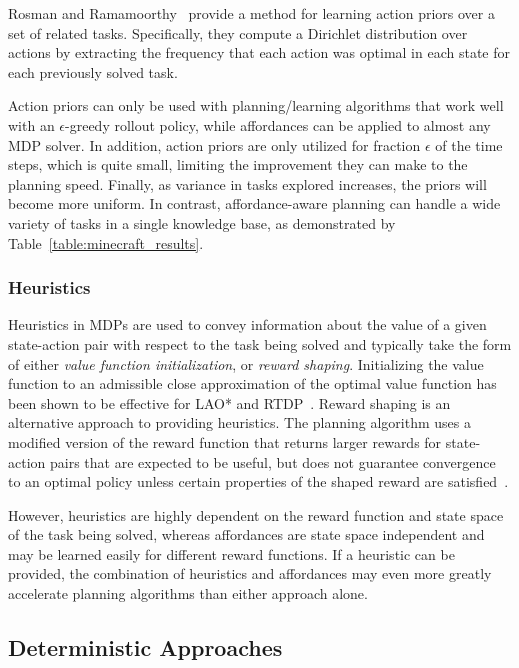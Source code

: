 \documentclass[letterpaper]{article}
\begin{document}
Rosman and Ramamoorthy~\cite{rosman2012good} provide a method for learning action
priors over a set of related tasks. Specifically, they compute a Dirichlet distribution over 
actions by extracting the frequency that each action was optimal in each state for each 
previously solved task.

Action priors can only be used with planning/learning algorithms that
work well with an $\epsilon$-greedy rollout policy, while affordances
can be applied to almost any MDP solver.  In addition, action
priors are only utilized for fraction $\epsilon$ of the time steps,
which is quite small, limiting the improvement they can make
to the planning speed.  Finally, as variance in tasks explored
increases, the priors will become more uniform. In contrast,
affordance-aware planning can handle a wide variety of tasks in a
single knowledge base, as demonstrated by
Table~\ref{table:minecraft_results}.

\subsubsection{Heuristics}
Heuristics in MDPs are used to convey information about the value of a
given state-action pair with respect to the task being solved and
typically take the form of either {\em value function initialization},
or {\em reward shaping}. Initializing the value function to an
admissible close approximation of the optimal value function has been
shown to be effective for LAO* and RTDP~\cite{Hansen:1999qf}.  Reward
shaping is an alternative approach to providing heuristics. The
planning algorithm uses a modified version of the reward function that
returns larger rewards for state-action pairs that are expected to be
useful, but does not guarantee convergence to an optimal policy unless
certain properties of the shaped reward are satisfied~\cite{potshap}.

However, heuristics are highly dependent on the reward function and
state space of the task being solved, whereas affordances are state
space independent and may be learned easily for different reward
functions. If a heuristic can be provided, the combination of
heuristics and affordances may even more greatly accelerate planning
algorithms than either approach alone.

\subsection{Deterministic Approaches}
\end{document}
